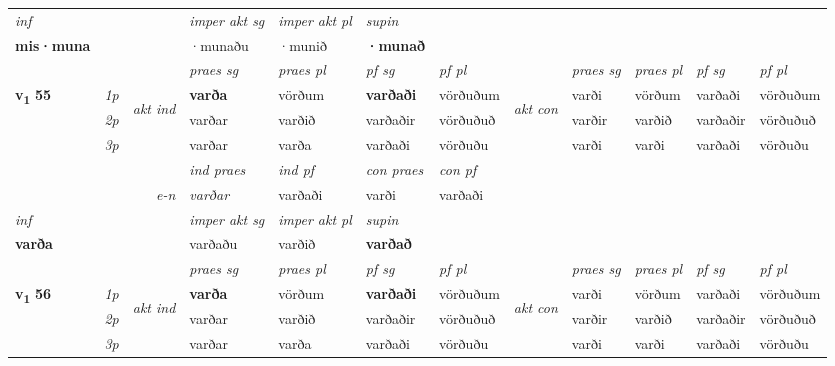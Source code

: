 \begin{longtable}[l]{X>{\footnotesize\itshape}llXXXXlXXXX}
   {\textit{inf}} & &  & \textit{imper akt sg} & \textit{imper akt pl}    & \textit{supin}   \\*
  {\textbf{mis\allowbreak ·muna}} & && ·munaðu  & ·munið    &  \textbf{·munað}   \\*

\midrule

 & &   & \textit{praes sg}  & \textit{praes pl}    & \textit{ pf sg} & \textit{pf pl} & & \textit{praes sg}  & \textit{praes pl}    & \textit{pf sg} & \textit{pf pl }  \\ \cmidrule{4-7} \cmidrule{9-12}
 \multirow{2}{*}{{{\textbf{v{\textsubscript{1}}} \Large{\textbf{55}}}}}  & 1p & \multirow{3}{*}{\begin{turn}{90}\textit{akt ind}\end{turn}} & \textbf{varða} & vörðum & \textbf{varðaði} & vörðuðum & \multirow{3}{*}{\begin{turn}{90}\textit{akt con}\end{turn}} &varði & vörðum & varðaði & vörðuðum\\*
 & 2p &  &  varðar  & varðið & varðaðir & vörðuðuð & & varðir & varðið & varðaðir & vörðuðuð \\*
 & 3p &  & varðar & varða & varðaði & vörðuðu & & varði & varði& varðaði & vörðuðu \\*
\cmidrule{4-7} \cmidrule{9-12}

   && &  \textit{ind praes} & \textit{ind pf} & \textit{con praes} & \textit{con pf} \\*
\multicolumn{3}{r}{\textit{e-n}} & varðar & varðaði & varði & varðaði \\*

\cmidrule{4-7}
   {\textit{inf}} & &  & \textit{imper akt sg} & \textit{imper akt pl}    & \textit{supin}   \\*
  {\textbf{varða}} & && varðaðu  & varðið    &  \textbf{varðað}   \\*

\midrule

 & &   & \textit{praes sg}  & \textit{praes pl}    & \textit{ pf sg} & \textit{pf pl} & & \textit{praes sg}  & \textit{praes pl}    & \textit{pf sg} & \textit{pf pl }  \\ \cmidrule{4-7} \cmidrule{9-12}
 \multirow{2}{*}{{{\textbf{v{\textsubscript{1}}} \Large{\textbf{56}}}}}  & 1p & \multirow{3}{*}{\begin{turn}{90}\textit{akt ind}\end{turn}} & \textbf{varða} & vörðum & \textbf{varðaði} & vörðuðum & \multirow{3}{*}{\begin{turn}{90}\textit{akt con}\end{turn}} &varði & vörðum & varðaði & vörðuðum\\*
 & 2p &  &  varðar  & varðið & varðaðir & vörðuðuð & & varðir & varðið & varðaðir & vörðuðuð \\*
 & 3p &  & varðar & varða & varðaði & vörðuðu & & varði & varði& varðaði & vörðuðu \\*
\cmidrule{4-7} \cmidrule{9-12}


\end{longtable}
